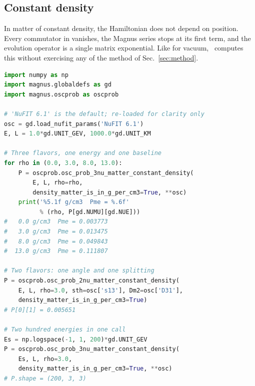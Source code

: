 \subsection{Constant density}
\label{sec:constant_density}

In matter of constant density, the Hamiltonian does not depend on position. Every commutator in  vanishes, the Magnus series stops at its first term, and the evolution operator is a single matrix exponential. Like for vacuum, \magnus\ computes this without exercising any of the method of Sec.~\ref{sec:method}.

\begin{lstlisting}[language=Python, caption={\textbf{Constant density at three and two flavors.} The density is swept from vacuum to about the value at the center of the Earth. The last call returns two hundred energies at one density, which the constant-Hamiltonian engine of Sec.~\ref{sec:engines} answers as a single stack of matrix exponentials. See Sec.~\ref{sec:constant_density} for details.}, label={lst:const_density}, float=tbp]
import numpy as np
import magnus.globaldefs as gd
import magnus.oscprob as oscprob

# 'NuFIT 6.1' is the default; re-loaded for clarity only
osc = gd.load_nufit_params('NuFIT 6.1')
E, L = 1.0*gd.UNIT_GEV, 1000.0*gd.UNIT_KM

# Three flavors, one energy and one baseline
for rho in (0.0, 3.0, 8.0, 13.0):
    P = oscprob.osc_prob_3nu_matter_constant_density(
        E, L, rho=rho,
        density_matter_is_in_g_per_cm3=True, **osc)
    print('%5.1f g/cm3  Pme = %.6f'
          % (rho, P[gd.NUMU][gd.NUE]))
#   0.0 g/cm3  Pme = 0.003773
#   3.0 g/cm3  Pme = 0.013475
#   8.0 g/cm3  Pme = 0.049843
#  13.0 g/cm3  Pme = 0.111807

# Two flavors: one angle and one splitting
P = oscprob.osc_prob_2nu_matter_constant_density(
    E, L, rho=3.0, sth=osc['s13'], Dm2=osc['D31'],
    density_matter_is_in_g_per_cm3=True)
# P[0][1] = 0.005651

# Two hundred energies in one call
Es = np.logspace(-1, 1, 200)*gd.UNIT_GEV
P = oscprob.osc_prob_3nu_matter_constant_density(
    Es, L, rho=3.0,
    density_matter_is_in_g_per_cm3=True, **osc)
# P.shape = (200, 3, 3)
\end{lstlisting}

